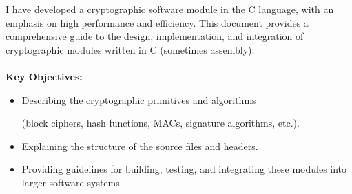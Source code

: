 \documentclass[11pt,a4paper]{report}
\theoremstyle{definitionstyle}
\begin{document}
I have developed a cryptographic software module in the C language, with an emphasis on high performance and efficiency. This document provides a comprehensive guide to the design, implementation, and integration of cryptographic modules written in C (sometimes assembly). 
\ \\
\ \\ \noindent
\textbf{Key Objectives:}
\begin{itemize}
	\item Describing the cryptographic primitives and algorithms\par 
	(block ciphers, hash functions, MACs, signature algorithms, etc.).
	\item Explaining the structure of the source files and headers.
	\item Providing guidelines for building, testing, and integrating these modules into larger software systems.
\end{itemize}
\end{document}

